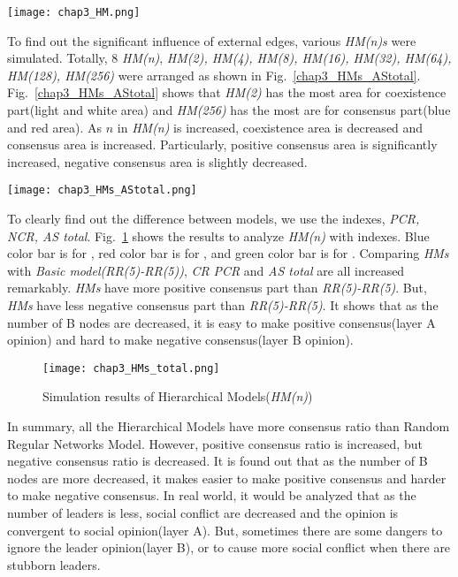 \begin{figure*}[!htb]
	\centering
	\texttt{[image: chap3\_HM.png]}
	\caption{Competition on hierarchical model}
	\label{chap3_HM}
\end{figure*}

To find out the significant influence of external edges, various \textit{HM(n)s} were simulated.  Totally, $8$ \textit{HM(n)}, \textit{HM(2), HM(4), HM(8), HM(16), HM(32), HM(64), HM(128), HM(256)} were arranged as shown in Fig.~\ref{chap3_HMs_AStotal}.  
Fig.~\ref{chap3_HMs_AStotal} shows that \textit{HM(2)} has the most area for coexistence part(light and white area) and \textit{HM(256)} has the most are for consensus part(blue and red area). As $n$ in \textit{HM(n)} is increased, coexistence area is decreased and consensus area is increased. Particularly, positive consensus area is significantly increased, negative consensus area is slightly decreased.  

\begin{figure*}[!htb]
	\centering
	\texttt{[image: chap3\_HMs\_AStotal.png]}
	\caption{Competition on hierarchical model}
	\label{chap3_HMs_AStotal}
\end{figure*}
To clearly find out the difference between models, we use the indexes, \textit{PCR, NCR, AS total}. Fig.~\ref{chap3_HMs_total} shows the results to analyze \textit{HM(n)} with indexes. Blue color bar is for , red color bar is for , and green color bar is for . Comparing \textit{HMs} with \textit{Basic model(RR(5)-RR(5))}, \textit{CR} \textit{PCR} and \textit{AS total} are all increased remarkably. \textit{HMs} have more positive consensus part than \textit{RR(5)-RR(5)}. But, \textit{HMs} have less negative consensus part than \textit{RR(5)-RR(5)}. It shows that as the number of B nodes are decreased, it is easy to make positive consensus(layer A opinion) and hard to make negative consensus(layer B opinion).  

\begin{figure}[!htb]
	\centering
	\texttt{[image: chap3\_HMs\_total.png]}
	\caption{Simulation results of Hierarchical Models(\textit{HM(n)})}
	\label{chap3_HMs_total}
\end{figure}

In summary, all the Hierarchical Models have more consensus ratio than Random Regular Networks Model. However, positive consensus ratio is increased, but negative consensus ratio is decreased. It is found out that as the number of B nodes are more decreased, it makes easier to make positive consensus and harder to make negative consensus. In real world, it would be analyzed that as the number of leaders is less, social conflict are decreased and the opinion is convergent to social opinion(layer A). But, sometimes there are some dangers to ignore the leader opinion(layer B), or to cause more social conflict when there are stubborn leaders. 

